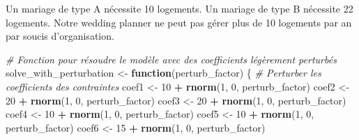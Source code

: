 \documentclass[
]{article}
\newenvironment{Shaded}{\begin{snugshade}}{\end{snugshade}}
\newcommand{\CommentTok}[1]{\textcolor[rgb]{0.56,0.35,0.01}{\textit{#1}}}
\newcommand{\ControlFlowTok}[1]{\textcolor[rgb]{0.13,0.29,0.53}{\textbf{#1}}}
\newcommand{\DecValTok}[1]{\textcolor[rgb]{0.00,0.00,0.81}{#1}}
\newcommand{\FunctionTok}[1]{\textcolor[rgb]{0.13,0.29,0.53}{\textbf{#1}}}
\newcommand{\NormalTok}[1]{#1}
\newcommand{\OtherTok}[1]{\textcolor[rgb]{0.56,0.35,0.01}{#1}}
\newcommand{\SpecialCharTok}[1]{\textcolor[rgb]{0.81,0.36,0.00}{\textbf{#1}}}
\begin{document}
Un mariage de type A nécessite 10 logements. Un mariage de type B
nécessite 22 logements. Notre wedding planner ne peut pas gérer plus de
10 logements par an par soucis d'organisation.

\begin{Shaded}
\begin{Highlighting}[]
\CommentTok{\# Fonction pour résoudre le modèle avec des coefficients légèrement perturbés}
\NormalTok{solve\_with\_perturbation }\OtherTok{\textless{}{-}} \ControlFlowTok{function}\NormalTok{(perturb\_factor) \{}
  \CommentTok{\# Perturber les coefficients des contraintes}
\NormalTok{  coef1 }\OtherTok{\textless{}{-}} \DecValTok{10} \SpecialCharTok{+} \FunctionTok{rnorm}\NormalTok{(}\DecValTok{1}\NormalTok{, }\DecValTok{0}\NormalTok{, perturb\_factor)}
\NormalTok{  coef2 }\OtherTok{\textless{}{-}} \DecValTok{20} \SpecialCharTok{+} \FunctionTok{rnorm}\NormalTok{(}\DecValTok{1}\NormalTok{, }\DecValTok{0}\NormalTok{, perturb\_factor)}
\NormalTok{  coef3 }\OtherTok{\textless{}{-}} \DecValTok{20} \SpecialCharTok{+} \FunctionTok{rnorm}\NormalTok{(}\DecValTok{1}\NormalTok{, }\DecValTok{0}\NormalTok{, perturb\_factor)}
\NormalTok{  coef4 }\OtherTok{\textless{}{-}} \DecValTok{10} \SpecialCharTok{+} \FunctionTok{rnorm}\NormalTok{(}\DecValTok{1}\NormalTok{, }\DecValTok{0}\NormalTok{, perturb\_factor)}
\NormalTok{  coef5 }\OtherTok{\textless{}{-}} \DecValTok{10} \SpecialCharTok{+} \FunctionTok{rnorm}\NormalTok{(}\DecValTok{1}\NormalTok{, }\DecValTok{0}\NormalTok{, perturb\_factor)}
\NormalTok{  coef6 }\OtherTok{\textless{}{-}} \DecValTok{15} \SpecialCharTok{+} \FunctionTok{rnorm}\NormalTok{(}\DecValTok{1}\NormalTok{, }\DecValTok{0}\NormalTok{, perturb\_factor)}


\end{Highlighting}
\end{Shaded}
\end{document}

